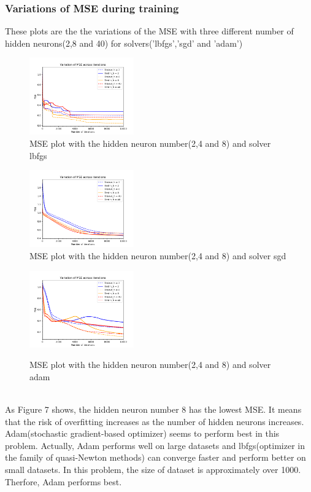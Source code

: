 \documentclass[a4paper]{article}
\begin{document}
\subsubsection{Variations of MSE during training}
These plots are the the variations of the MSE with three diﬀerent number of hidden neurons(2,8 and 40) for solvers('lbfgs','sgd' and 'adam')\\
\begin{figure}[h]
  \includegraphics[width=0.4\textwidth]{ex_1_1_d_lbfgs.png}\\
  \caption{MSE plot with the hidden neuron number(2,4 and 8) and solver lbfgs}
  \includegraphics[width=0.4\textwidth]{ex_1_1_d_sgd.png}\\
  \caption{MSE plot with the hidden neuron number(2,4 and 8) and solver sgd}
  \includegraphics[width=0.4\textwidth]{ex_1_1_d_adam.png}\\
  \caption{MSE plot with the hidden neuron number(2,4 and 8) and solver adam}
\end{figure}
\\
\noindent
As Figure 7 shows, the hidden neuron number 8 has the lowest MSE. It means that the risk of overfitting increases as the number of hidden neurons increases.\\
Adam(stochastic gradient-based optimizer) seems to perform best in this problem. Actually, Adam performs well on large datasets and lbfgs(optimizer in the family of quasi-Newton methods) can converge faster and perform better on small datasets. In this problem, the size of dataset is approximately over 1000. Therfore, Adam performs best.\\
\end{document}
